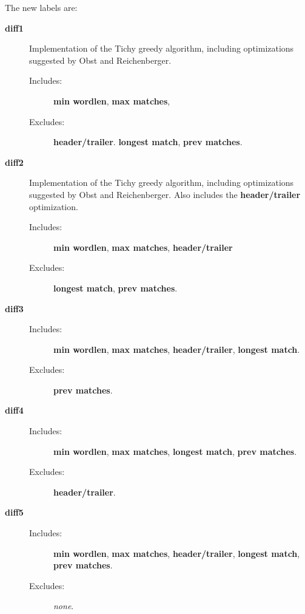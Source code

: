 The new labels are:
\begin{description}
\item[\textbf{diff1}]
    Implementation of the Tichy greedy algorithm, including optimizations
    suggested by Obst and Reichenberger.
    \begin{description}
    \item[Includes:]
        \textbf{min wordlen}, \textbf{max matches},
    \item[Excludes:]
        \textbf{header/trailer}.
        \textbf{longest match}, \textbf{prev matches}.
    \end{description}

\item[\textbf{diff2}]
    Implementation of the Tichy greedy algorithm, including optimizations
    suggested by Obst and Reichenberger.  Also includes the
    \textbf{header/trailer} optimization.
    \begin{description}
    \item[Includes:]
        \textbf{min wordlen}, \textbf{max matches}, \textbf{header/trailer}
    \item[Excludes:]
        \textbf{longest match}, \textbf{prev matches}.
    \end{description}

\item[\textbf{diff3}]
    \begin{description}
    \item[Includes:]
        \textbf{min wordlen}, \textbf{max matches},
        \textbf{header/trailer}, \textbf{longest match}.
    \item[Excludes:]
        \textbf{prev matches}.
    \end{description}

\item[\textbf{diff4}]
    \begin{description}
    \item[Includes:]
        \textbf{min wordlen}, \textbf{max matches}, \textbf{longest match},
        \textbf{prev matches}.
    \item[Excludes:]
        \textbf{header/trailer}.
    \end{description}
\item[\textbf{diff5}]
    \begin{description}
    \item[Includes:]
        \textbf{min wordlen}, \textbf{max matches},
        \textbf{header/trailer}, \textbf{longest match},
        \textbf{prev matches}.
    \item[Excludes:] \textit{none}.
    \end{description}


\end{description}
